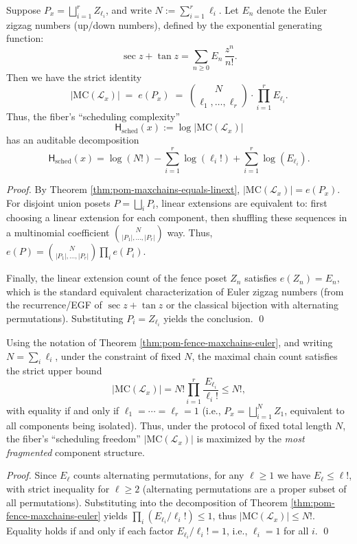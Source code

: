 \begin{theorem}\label{thm:pom-fence-maxchains-euler}
Suppose \(P_x=\bigsqcup_{i=1}^r Z_{\ell_i}\), and write \(N:=\sum_{i=1}^r \ell_i\).
Let \(E_n\) denote the Euler zigzag numbers (up/down numbers), defined by the exponential generating function:
\[
\sec z+\tan z=\sum_{n\ge 0} E_n\,\frac{z^n}{n!}.
\]
Then we have the strict identity
\[
|\mathrm{MC}(\mathcal L_x)|
\;=\;
e(P_x)
\;=\;
\binom{N}{\ell_1,\dots,\ell_r}\cdot \prod_{i=1}^r E_{\ell_i}.
\]
Thus, the fiber's ``scheduling complexity''
\[
\mathsf H_{\mathrm{sched}}(x):=\log |\mathrm{MC}(\mathcal L_x)|
\]
has an auditable decomposition
\[
\mathsf H_{\mathrm{sched}}(x)
=\log(N!) -\sum_{i=1}^r \log(\ell_i!) + \sum_{i=1}^r \log(E_{\ell_i}).
\]
\end{theorem}
\begin{proof}
By Theorem \ref{thm:pom-maxchains-equals-linext}, \(|\mathrm{MC}(\mathcal L_x)|=e(P_x)\).
For disjoint union posets \(P=\bigsqcup_i P_i\), linear extensions are equivalent to: first choosing a linear extension for each component, then shuffling these sequences in a multinomial coefficient \(\binom{N}{|P_1|,\dots,|P_r|}\) way.
Thus, \(e(P)=\binom{N}{|P_1|,\dots,|P_r|}\prod_i e(P_i)\).
\par
Finally, the linear extension count of the fence poset \(Z_n\) satisfies \(e(Z_n)=E_n\), which is the standard equivalent characterization of Euler zigzag numbers (from the recurrence/EGF of \(\sec z+\tan z\) or the classical bijection with alternating permutations).
Substituting \(P_i=Z_{\ell_i}\) yields the conclusion. \qed
\end{proof}

\begin{corollary}\label{cor:pom-fence-maxchains-all-isolated-optimal}
Using the notation of Theorem \ref{thm:pom-fence-maxchains-euler}, and writing \(N=\sum_i \ell_i\),
under the constraint of fixed \(N\), the maximal chain count satisfies the strict upper bound
\[
|\mathrm{MC}(\mathcal L_x)|
=
N!\prod_{i=1}^r \frac{E_{\ell_i}}{\ell_i!}
\le
N!,
\]
with equality if and only if \(\ell_1=\cdots=\ell_r=1\) (i.e., \(P_x=\bigsqcup_{i=1}^{N} Z_1\), equivalent to all components being isolated).
Thus, under the protocol of fixed total length \(N\), the fiber's ``scheduling freedom'' \(|\mathrm{MC}(\mathcal L_x)|\) is maximized by the \emph{most fragmented} component structure.
\end{corollary}
\begin{proof}
Since \(E_\ell\) counts alternating permutations, for any \(\ell\ge 1\) we have \(E_\ell\le \ell!\), with strict inequality for \(\ell\ge 2\) (alternating permutations are a proper subset of all permutations).
Substituting into the decomposition of Theorem \ref{thm:pom-fence-maxchains-euler} yields
\(
\prod_i(E_{\ell_i}/\ell_i!)\le 1
\), thus \(|\mathrm{MC}(\mathcal L_x)|\le N!\).
Equality holds if and only if each factor \(E_{\ell_i}/\ell_i!=1\), i.e., \(\ell_i=1\) for all \(i\). \qed
\end{proof}


